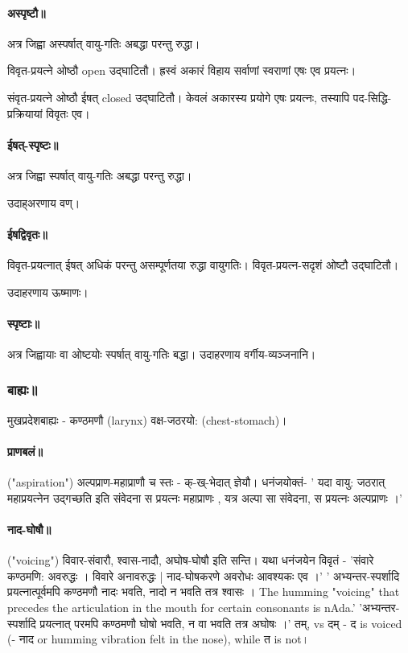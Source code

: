 \documentclass[oneside, article]{memoir}
\begin{document}
\paragraph{अस्पृष्टौ॥}
अत्र जिह्वा अस्पर्षात् वायु-गतिः अबद्धा परन्तु रुद्धा।

विवृत-प्रयत्ने ओष्ठौ open उद्घाटितौ। ह्रस्वं अकारं विहाय सर्वाणां स्वराणां एषः एव प्रयत्नः।

संवृत-प्रयत्ने ओष्ठौ ईषत् closed उद्घाटितौ। केवलं अकारस्य प्रयोगे एषः प्रयत्नः, तस्यापि पद-सिद्धि-प्रक्रियायां विवृतः एव।

\paragraph{ईषत्-स्पृष्टः॥}
अत्र जिह्वा स्पर्षात् वायु-गतिः अबद्धा परन्तु रुद्धा।

उदाह्अरणाय वण्।

\paragraph{ ईषद्विवृतः॥}
विवृत-प्रयत्नात् ईषत् अधिकं परन्तु असम्पूर्णतया रुद्धा वायुगतिः। विवृत-प्रयत्न-सदृशं ओष्टौ उद्घाटितौ।

उदाहरणाय ऊष्माणः।

\paragraph{स्पृष्टाः॥}
अत्र जिह्वायाः वा ओष्टयोः स्पर्षात् वायु-गतिः बद्धा। उदाहरणाय वर्गीय-व्यञ्जनानि।

\subsubsection{बाह्यः॥}
मुखप्रदेशबाह्यः -  कण्ठमणौ (larynx) वक्ष-जठरयो: (chest-stomach)।

\paragraph{प्राणबलं॥}
("aspiration") अल्पप्राण-महाप्राणौ च स्तः - क्-ख्-भेदात् ज्ञेयौ। धनंजयोक्तं- ' यदा वायु: जठरात् महाप्रयत्नेन उद्गच्छति इति संवेदना स प्रयत्नः महाप्राणः , यत्र अल्पा सा संवेदना, स प्रयत्नः अल्पप्राणः ।'

\paragraph{नाद-घोषौ॥}
("voicing") विवार-संवारौ, श्वास-नादौ, अघोष-घोषौ इति सन्ति। यथा धनंजयेन विवृतं - 'संवारे कण्ठमणि: अवरुद्धः । विवारे अनावरुद्धः | नाद-घोषकरणे अवरोधः आवश्यकः एव ।' ' अभ्यन्तर-स्पर्शादि प्रयत्नात्पूर्वमपि कण्ठमणौ नादः भवति, नादो न भवति तत्र श्वासः । The humming "voicing" that precedes the articulation in the mouth for certain consonants is nAda.' 'अभ्यन्तर-स्पर्शादि प्रयत्नात् परमपि कण्ठमणौ घोषो भवति, न वा भवति तत्र अघोषः ।' तम्, vs दम् - द is voiced (- नाद or humming vibration felt in the nose), while त is not।
\end{document}

